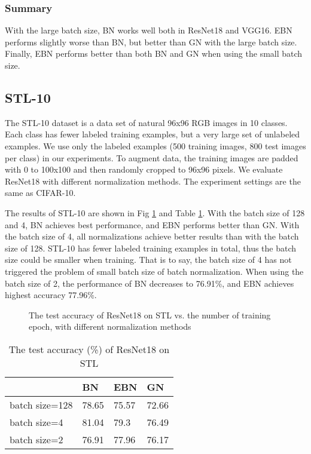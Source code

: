 \documentclass[runningheads]{llncs}
\begin{document}
\subsubsection{Summary}  With the large batch size, BN works well both in ResNet18 and VGG16. EBN performs slightly worse than BN, but better than GN with the large batch size. Finally, EBN performs better than both BN and GN when using the small batch size. 

\subsection{STL-10}

The STL-10 dataset is a data set of natural 96x96 RGB images in 10 classes. Each class has fewer labeled training examples, but a very large set of unlabeled examples. We use only the labeled examples (500 training images, 800 test images per class) in our experiments. 
To augment data, the training images are padded with 0 to 100x100 and then randomly cropped to 96x96 pixels. We evaluate ResNet18 with different normalization methods. The experiment settings are the same as CIFAR-10.


The results of STL-10 are shown in Fig \ref{fig_stl}  and Table \ref{tab_stl}. With the batch size of 128 and 4, BN achieves best performance, and EBN performs better than GN. With the batch size of 4, all normalizations achieve better results than with the batch size of 128. STL-10 has fewer labeled training examples in total, thus the batch size could be smaller when training. That is to say, the batch size of 4 has not triggered the problem of small batch size of batch normalization. When using the batch size of 2, the performance of BN decreases to 76.91\%, and EBN achieves highest accuracy 77.96\%.


\begin{figure}[!htb]
\centering
{}
\centering
{}
\centering
{}
\caption{The test accuracy of ResNet18 on STL vs. the number of training epoch, with different normalization methods}
\label{fig_stl}
\end{figure}

\begin{table}[!htb]
\caption{The test accuracy (\%) of ResNet18 on STL}
\label{tab_stl}
\centering
\begin{tabular}{l|lll}
\hline
  & BN & EBN & GN \\
\hline
batch size=128     & 78.65  & 	75.57 & 72.66     \\
batch size=4       & 81.04  & 79.3 & 76.49     \\
batch size=2       & 76.91  & 77.96 & 76.17     \\
\hline
\end{tabular}
\end{table}
\end{document}
